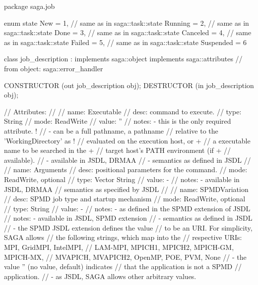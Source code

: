  \begin{myspec}
  package saga.job
  {
    enum state
    {
      New        =  1,  // same as in saga::task::state
      Running    =  2,  // same as in saga::task::state
      Done       =  3,  // same as in saga::task::state
      Canceled   =  4,  // same as in saga::task::state
      Failed     =  5,  // same as in saga::task::state
      Suspended  =  6
    }
 
 
    class job_description : implements   saga::object
                            implements   saga::attributes
                         // from object: saga::error_handler
    {
      CONSTRUCTOR          (out job_description obj);
      DESTRUCTOR           (in  job_description obj);
 
      // Attributes:
      //
      //   name:  Executable
      //   desc:  command to execute. 
      //   type:  String
      //   mode:  ReadWrite
      //   value: ''
      //   notes: - this is the only required attribute.  
!     //          - can be a full pathname, a pathname 
      //            relative to the 'WorkingDirectory' as 
!     //            evaluated on the execution host, or
+     //            a executable name to be searched in the
+     //            target host's PATH environment (if 
+     //            available).
      //          - available in JSDL, DRMAA
      //          - semantics as defined in JSDL
      //
      //   name:  Arguments
      //   desc:  positional parameters for the command. 
      //   mode:  ReadWrite, optional
      //   type:  Vector String
      //   value: -
      //   notes: - available in JSDL, DRMAA
      //            semantics as specified by JSDL
      // 
      //   name:  SPMDVariation
      //   desc:  SPMD job type and startup mechanism
      //   mode:  ReadWrite, optional
      //   type:  String
      //   value: -
      //   notes: - as defined in the SPMD extension of JSDL
      //   notes: - available in JSDL, SPMD extension
      //          - semantics as defined in JSDL
      //          - the SPMD JSDL extension defines the value
      //            to be an URI.  For simplicity, SAGA allows
      //            the following strings, which map into the 
      //            respective URIs: MPI, GridMPI, IntelMPI,
      //            LAM-MPI, MPICH1, MPICH2, MPICH-GM, MPICH-MX,
      //            MVAPICH, MVAPICH2, OpenMP, POE, PVM, None
      //          - the value '' (no value, default) indicates
      //            that the application is not a SPMD 
      //            application.
      //          - as JSDL, SAGA allows other arbitrary values.
}}
\end{myspec}
